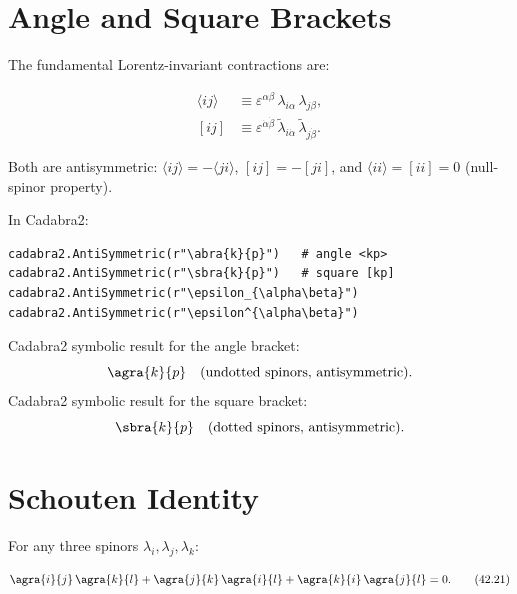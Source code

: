 \documentclass[12pt]{article}
\begin{document}
\section{Angle and Square Brackets}\label{sec:brackets}

The fundamental Lorentz-invariant contractions are:

\begin{mdframed}
\begin{align}
\langle ij\rangle &\equiv \varepsilon^{\alpha\beta}\,
\lambda_{i\alpha}\,\lambda_{j\beta} , \tag{42.16} \\[2mm]
[ij] &\equiv \varepsilon^{\dot\alpha\dot\beta}\,
\tilde\lambda_{i\dot\alpha}\,\tilde\lambda_{j\dot\beta} . \tag{42.17}
\end{align}
\end{mdframed}

Both are antisymmetric: $\langle ij\rangle=-\langle ji\rangle$,
$[ij]=-[ji]$, and $\langle ii\rangle=[ii]=0$ (null-spinor property).

In Cadabra2:
\begin{verbatim}
cadabra2.AntiSymmetric(r"\abra{k}{p}")   # angle <kp>
cadabra2.AntiSymmetric(r"\sbra{k}{p}")   # square [kp]
cadabra2.AntiSymmetric(r"\epsilon_{\alpha\beta}")
cadabra2.AntiSymmetric(r"\epsilon^{\alpha\beta}")
\end{verbatim}

Cadabra2 symbolic result for the angle bracket:
\begin{equation}
\agra{k}{p}\quad\text{(undotted spinors, antisymmetric)} .
\end{equation}
Cadabra2 symbolic result for the square bracket:
\begin{equation}
\sbra{k}{p}\quad\text{(dotted spinors, antisymmetric)} .
\end{equation}

\section{Schouten Identity}\label{sec:schouten}

For any three spinors $\lambda_i,\lambda_j,\lambda_k$:

\begin{mdframed}[backgroundcolor=yellow!5]
\begin{equation}
\agra{i}{j}\,\agra{k}{l}
+ \agra{j}{k}\,\agra{i}{l}
+ \agra{k}{i}\,\agra{j}{l} = 0 .
\tag{42.21}
\end{equation}
\end{mdframed}
\end{document}
